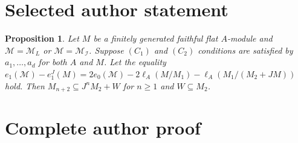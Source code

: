 \documentclass[10pt,a4paper]{amsart}
\newtheorem{proposition}{Proposition}
\def\I{{\mathcal I}}
\def\M{{\mathcal M}}
\begin{document}
\section*{Selected author statement}
\begin{proposition}\label{theorem-4.3}
 Let $M$ be a finitely generated faithful flat $A$-module and $\M=\M_L$ or $\M=\M_\I$. Suppose $(C_1)$ and $(C_2)$ conditions are satisfied by $a_1,\ldots,a_d$ for both $A$ and $M$.  Let the equality
	$e_1(\M)-e_1^J(M)=2e_0(\M)-2\ell_A(M/M_1)-\ell_A(M_1/(M_2+JM))$ hold. Then $M_{n+2}\subseteq J^nM_2+W$ for $n\geq 1$ and $W\subseteq M_2$.
\end{proposition}
\section*{Complete author proof}
\end{document}
